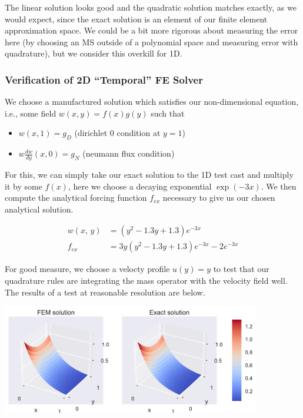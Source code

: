 \documentclass[10pt]{article}
\begin{document}
  The linear solution looks good and the quadratic solution matches exactly, as we would expect,
  since the exact solution is an element of our finite element approximation space. We could be a
  bit more rigorous about measuring the error here (by choosing an MS outside of a polynomial space
  and measuring error with quadrature), but we consider this overkill for 1D.

  \subsubsection{Verification of 2D ``Temporal'' FE Solver}

  We choose a manufactured solution which satisfies our non-dimensional equation, i.e.,
  some field $w(x, y) = f(x) g(y)$ such that

  \begin{itemize}
    \item $w(x, 1) = g_D$ (dirichlet 0 condition at $y=1$)
    \item $w\frac{d w}{d y}(x, 0) = g_N$ (neumann flux condition)
  \end{itemize}

  For this, we can simply take our exact solution to the 1D test cast and multiply it by some
  $f(x)$, here we choose a decaying exponential $\exp(-3x)$. We then compute the analytical forcing
  function $f_{ex}$ necessary to give us our chosen analytical solution.  

  \begin{align}
    w(x,\, y) &= \left(y^{2} - 1.3 y + 1.3\right) e^{- 3 x} \\
    f_{ex} &=  3 y \left(y^{2} - 1.3 y + 1.3\right) e^{- 3 x} - 2 e^{- 3 x}
  \end{align}
  
  For good measure, we
  choose a velocty profile $u(y) = y$ to test that our quadrature rules are integrating the mass
  operator with the velocity field well. The results of a test at reasonable resolution are below.\\

  \centerline{\includegraphics[width=0.85\textwidth]{img/2D_MS_result.pdf}}
\end{document}

